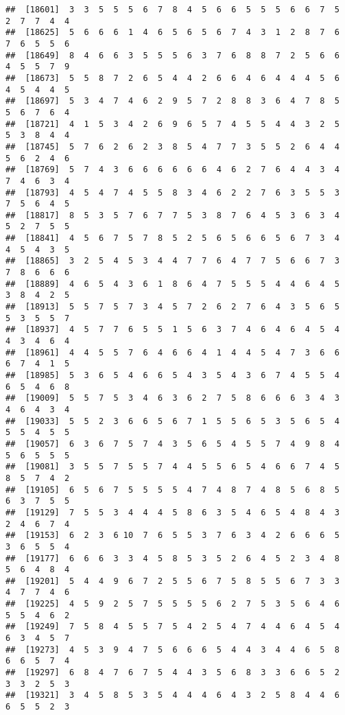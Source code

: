 \documentclass[
]{book}
\begin{document}
\begin{verbatim}
##  [18601]  3  3  5  5  5  6  7  8  4  5  6  6  5  5  5  6  6  7  5  2  7  7  4  4
##  [18625]  5  6  6  6  1  4  6  5  6  5  6  7  4  3  1  2  8  7  6  7  6  5  5  6
##  [18649]  8  4  6  6  3  5  5  5  6  3  7  6  8  8  7  2  5  6  6  4  5  5  7  9
##  [18673]  5  5  8  7  2  6  5  4  4  2  6  6  4  6  4  4  4  5  6  4  5  4  4  5
##  [18697]  5  3  4  7  4  6  2  9  5  7  2  8  8  3  6  4  7  8  5  5  6  7  6  4
##  [18721]  4  1  5  3  4  2  6  9  6  5  7  4  5  5  4  4  3  2  5  5  3  8  4  4
##  [18745]  5  7  6  2  6  2  3  8  5  4  7  7  3  5  5  2  6  4  4  5  6  2  4  6
##  [18769]  5  7  4  3  6  6  6  6  6  6  4  6  2  7  6  4  4  3  4  7  4  6  3  4
##  [18793]  4  5  4  7  4  5  5  8  3  4  6  2  2  7  6  3  5  5  3  7  5  6  4  5
##  [18817]  8  5  3  5  7  6  7  7  5  3  8  7  6  4  5  3  6  3  4  5  2  7  5  5
##  [18841]  4  5  6  7  5  7  8  5  2  5  6  5  6  6  5  6  7  3  4  4  5  4  3  5
##  [18865]  3  2  5  4  5  3  4  4  7  7  6  4  7  7  5  6  6  7  3  7  8  6  6  6
##  [18889]  4  6  5  4  3  6  1  8  6  4  7  5  5  5  4  4  6  4  5  3  8  4  2  5
##  [18913]  5  5  7  5  7  3  4  5  7  2  6  2  7  6  4  3  5  6  5  5  3  5  5  7
##  [18937]  4  5  7  7  6  5  5  1  5  6  3  7  4  6  4  6  4  5  4  4  3  4  6  4
##  [18961]  4  4  5  5  7  6  4  6  6  4  1  4  4  5  4  7  3  6  6  6  7  4  1  5
##  [18985]  5  3  6  5  4  6  6  5  4  3  5  4  3  6  7  4  5  5  4  6  5  4  6  8
##  [19009]  5  5  7  5  3  4  6  3  6  2  7  5  8  6  6  6  3  4  3  4  6  4  3  4
##  [19033]  5  5  2  3  6  6  5  6  7  1  5  5  6  5  3  5  6  5  4  5  5  4  5  5
##  [19057]  6  3  6  7  5  7  4  3  5  6  5  4  5  5  7  4  9  8  4  5  6  5  5  5
##  [19081]  3  5  5  7  5  5  7  4  4  5  5  6  5  4  6  6  7  4  5  8  5  7  4  2
##  [19105]  6  5  6  7  5  5  5  5  4  7  4  8  7  4  8  5  6  8  5  6  3  7  5  5
##  [19129]  7  5  5  3  4  4  4  5  8  6  3  5  4  6  5  4  8  4  3  2  4  6  7  4
##  [19153]  6  2  3  6 10  7  6  5  5  3  7  6  3  4  2  6  6  6  5  3  6  5  5  4
##  [19177]  6  6  6  3  3  4  5  8  5  3  5  2  6  4  5  2  3  4  8  5  6  4  8  4
##  [19201]  5  4  4  9  6  7  2  5  5  6  7  5  8  5  5  6  7  3  3  4  7  7  4  6
##  [19225]  4  5  9  2  5  7  5  5  5  5  6  2  7  5  3  5  6  4  6  5  5  4  6  2
##  [19249]  7  5  8  4  5  5  7  5  4  2  5  4  7  4  4  6  4  5  4  6  3  4  5  7
##  [19273]  4  5  3  9  4  7  5  6  6  6  5  4  4  3  4  4  6  5  8  6  6  5  7  4
##  [19297]  6  8  4  7  6  7  5  4  4  3  5  6  8  3  3  6  6  5  2  3  3  2  5  3
##  [19321]  3  4  5  8  5  3  5  4  4  4  6  4  3  2  5  8  4  4  6  6  5  5  2  3

\end{verbatim}
\end{document}
